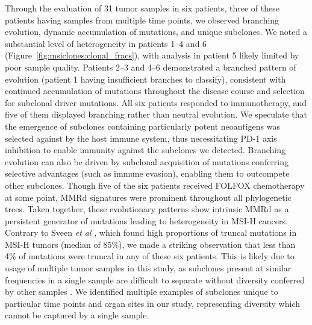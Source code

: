 Through the evaluation of 31 tumor samples in six patients, three of these patients having samples from multiple time points, we observed branching evolution, dynamic accumulation of mutations, and unique subclones. We noted a substantial level of heterogeneity in patients 1--4 and 6 (Figure~\ref{fig:msiclones:clonal_fracs}), with analysis in patient 5 likely limited by poor sample quality. Patients 2--3 and 4--6 demonstrated a branched pattern of evolution \cite{davis2017} (patient 1 having insufficient branches to classify), consistent with continued accumulation of mutations throughout the disease course and selection for subclonal driver mutations. All six patients responded to immunotherapy, and five of them displayed branching rather than neutral evolution. We speculate that the emergence of subclones containing particularly potent neoantigens was selected against by the host immune system, thus necessitating PD-1 axis inhibition to enable immunity against the subclones we detected. Branching evolution can also be driven by subclonal acquisition of mutations conferring selective advantages (such as immune evasion), enabling them to outcompete other subclones. Though five of the six patients received FOLFOX chemotherapy at some point, MMRd signatures were prominent throughout all phylogenetic trees. Taken together, these evolutionary patterns show intrinsic MMRd as a persistent generator of mutations leading to heterogeneity in MSI-H cancers.  Contrary to Sveen \textit{et al} \cite{sveen2017}, which found high proportions of truncal mutations in MSI-H tumors (median of 85\%), we made a striking observation that less than 4\% of mutations were truncal in any of these six patients. This is likely due to usage of multiple tumor samples in this study, as subclones present at similar frequencies in a single sample are difficult to separate without diversity conferred by other samples \cite{abecassis2019}. We identified multiple examples of subclones unique to particular time points and organ sites in our study, representing diversity which cannot be captured by a single sample.

